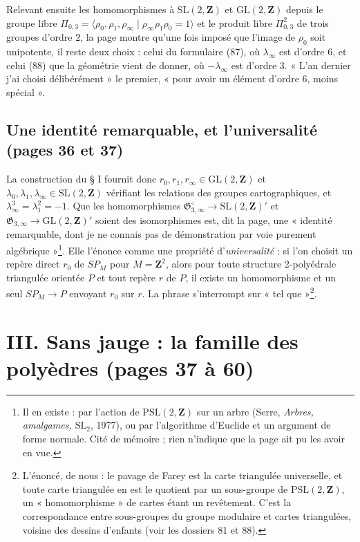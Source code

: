 \documentclass[11pt,a4paper]{article}
\begin{document}
Relevant ensuite les homomorphismes à $\mathrm{SL}(2, \mathbf{Z})$ et
$\mathrm{GL}(2, \mathbf{Z})$ depuis le groupe libre $\Pi_{0,3} = \langle
\rho_0, \rho_1, \rho_\infty \mid \rho_\infty\rho_1\rho_0 = 1\rangle$ et le
produit libre $\Pi^2_{0,3}$ de trois groupes d'ordre $2$, la page montre qu'une
fois imposé que l'image de $\rho_0$ soit unipotente, il reste deux choix :
celui du formulaire (87), où $\lambda_\infty$ est d'ordre $6$, et celui (88)
que la géométrie vient de donner, où $-\lambda_\infty$ est d'ordre $3$.
« L'an dernier j'ai choisi délibérément » le premier, « pour avoir un élément
d'ordre $6$, moins spécial ».

\subsection*{Une identité remarquable, et l'universalité (pages 36 et 37)}

La construction du § I fournit donc $r_0, r_1, r_\infty \in \mathrm{GL}(2,
\mathbf{Z})$ et $\lambda_0, \lambda_1, \lambda_\infty \in \mathrm{SL}(2,
\mathbf{Z})$ vérifiant les relations des groupes cartographiques, et
$\lambda_\infty^3 = \lambda_1^2 = -1$. Que les homomorphismes
$\mathfrak{G}^{\circ}_{3,\infty} \to \mathrm{SL}(2, \mathbf{Z})'$ et
$\mathfrak{G}_{3,\infty} \to \mathrm{GL}(2, \mathbf{Z})'$ soient des
isomorphismes est, dit la page, une « identité remarquable, dont je ne connais
pas de démonstration par voie purement algébrique »\footnote{Il en existe :
par l'action de $\mathrm{PSL}(2, \mathbf{Z})$ sur un arbre (Serre,
\emph{Arbres, amalgames, $\mathrm{SL}_2$}, 1977), ou par l'algorithme d'Euclide
et un argument de forme normale. Cité de mémoire ; rien n'indique que la page
ait pu les avoir en vue.}. Elle l'énonce comme une propriété
d'\emph{universalité} : si l'on choisit un repère direct $r_0$ de $SP_M$ pour
$M = \mathbf{Z}^2$, alors pour toute structure 2-polyédrale triangulée
orientée $P$ et tout repère $r$ de $P$, il existe un homomorphisme et un seul
$SP_M \to P$ envoyant $r_0$ sur $r$. La phrase s'interrompt sur « tel
que »\footnote{L'énoncé, de nous : le pavage de Farey est la carte triangulée
universelle, et toute carte triangulée en est le quotient par un sous-groupe
de $\mathrm{PSL}(2, \mathbf{Z})$, un « homomorphisme » de cartes étant un
revêtement. C'est la correspondance entre sous-groupes du groupe modulaire et
cartes triangulées, voisine des dessins d'enfants (voir les dossiers 81 et
88).}.

\section*{III. Sans jauge : la famille des polyèdres (pages 37 à 60)}
\end{document}

